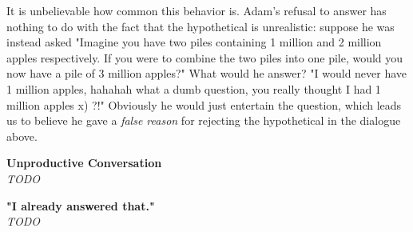 It is unbelievable how common this behavior is. Adam's refusal to answer has nothing to do with the fact that the hypothetical is unrealistic: suppose he was instead asked "Imagine you have two piles containing 1 million and 2 million apples respectively. If you were to combine the two piles into one pile, would you now have a pile of 3 million apples?" What would he answer? "I would never have 1 million apples, hahahah what a dumb question, you really thought I had 1 million apples x) ?!" 
Obviously he would just entertain the question, which leads us to believe he gave a \textit{false reason} for rejecting the hypothetical in the dialogue above.

\par
\textbf{Unproductive Conversation}\\
\textit{TODO}

\par
\textbf{"I already answered that."}\\
\textit{TODO}

